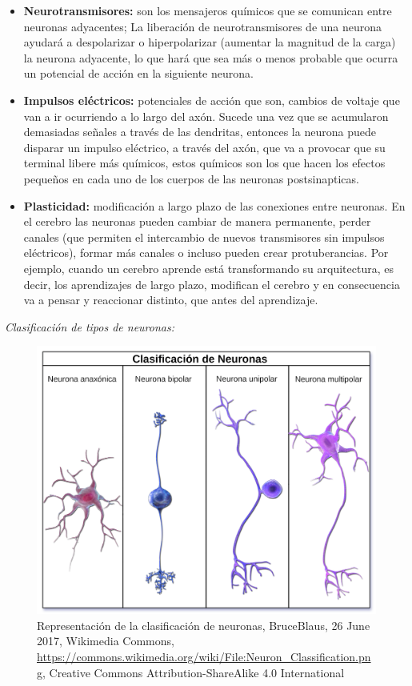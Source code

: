 \begin{itemize}
\item \textbf{Neurotransmisores:} son los mensajeros químicos que se comunican entre neuronas adyacentes; La liberación de neurotransmisores de una neurona ayudará a despolarizar o hiperpolarizar (aumentar la magnitud de la carga) la neurona adyacente, lo que hará que sea más o menos probable que ocurra un potencial de acción en la siguiente neurona.
  
\item \textbf{Impulsos eléctricos:} potenciales de acción que son, cambios de voltaje que van a ir ocurriendo a lo largo del axón. Sucede una vez que se acumularon demasiadas señales a través de las dendritas, entonces la neurona puede disparar un impulso eléctrico, a través del axón, que va a provocar que su terminal libere más químicos, estos químicos son los que hacen los efectos pequeños en cada uno de los cuerpos de las neuronas postsinapticas.
 
\item \textbf{Plasticidad:} modificación a largo plazo de las conexiones entre neuronas. En el cerebro las neuronas pueden cambiar de manera permanente, perder canales (que permiten el intercambio de nuevos transmisores sin impulsos eléctricos), formar más canales o incluso pueden crear protuberancias. Por ejemplo, cuando un cerebro aprende está transformando su arquitectura, es decir, los aprendizajes de largo plazo, modifican el cerebro y en consecuencia va a pensar y reaccionar distinto, que antes del aprendizaje.
\end{itemize}

\emph{Clasificación de tipos de neuronas:}


\begin{figure}[h]
 \centering
 \includegraphics[scale=0.15]{../Figuras/tiposDeNeuronas.png}
 \caption{Representación de la clasificación de neuronas, BruceBlaus, 26 June 2017, Wikimedia Commons, \url{https://commons.wikimedia.org/wiki/File:Neuron_Classification.png}, Creative Commons Attribution-ShareAlike 4.0 International}
 \label{fig:tiposNeuro}
\end{figure}


